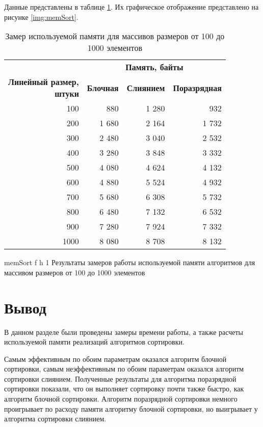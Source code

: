 Данные представлены в таблице \ref{tbl:mem}. Их графическое отображение представлено на рисунке \ref{img:memSort}.

\clearpage

\begin{table}[ht]
	\small
	\begin{center}
		\begin{threeparttable}
			\caption{Замер используемой памяти для массивов размеров от 100 до 1000 элементов}
			\label{tbl:mem}
			\begin{tabular}{|r|r|r|r|}
				\hline
				& \multicolumn{3}{c|}{\bfseries Память, байты} \\ \cline{2-4}
				\bfseries \makecell{Линейный размер, \\ штуки} & \bfseries Блочная & \bfseries Слиянием & \bfseries Поразрядная \\ \cline{2-4}
				\hline
				100 & 880 & 1 280 & 932 \\
				\hline
				200 & 1 680 & 2 164 & 1 732 \\
				\hline
				300 & 2 480 & 3 040 & 2 532 \\
				\hline
				400 & 3 280 & 3 848 & 3 332 \\
				\hline
				500 & 4 080 & 4 624 & 4 132 \\
				\hline
				600 & 4 880 & 5 524 & 4 932 \\
				\hline
				700 & 5 680 & 6 308 & 5 732 \\
				\hline
				800 & 6 480 & 7 132 & 6 532 \\
				\hline
				900 & 7 280 & 7 924 & 7 332 \\
				\hline
				1000 & 8 080 & 8 708 & 8 132 \\
				\hline
			\end{tabular}	
		\end{threeparttable}
	\end{center}
\end{table}

\clearpage

{memSort} %
{f} %
{h} %
{1\textwidth} %
{Результаты замеров работы используемой памяти алгоритмов для массивом размеров от 100 до 1000 элементов} %

\section*{Вывод}

В данном разделе были проведены замеры времени работы, а также расчеты используемой памяти реализаций алгоритмов сортировки. 

Самым эффективным по обоим параметрам оказался алгоритм блочной сортировки, самым неэффективным по обоим параметрам оказался алгоритм сортировки слиянием. Полученные результаты для алгоритма поразрядной сортировки показали, что он выполняет сортировку почти также быстро, как алгоритм блочной сортировки. Алгоритм поразрядной сортировки немного проигрывает по расходу памяти алгоритму блочной сортировки, но выигрывает у алгоритма сортировки слиянием.

